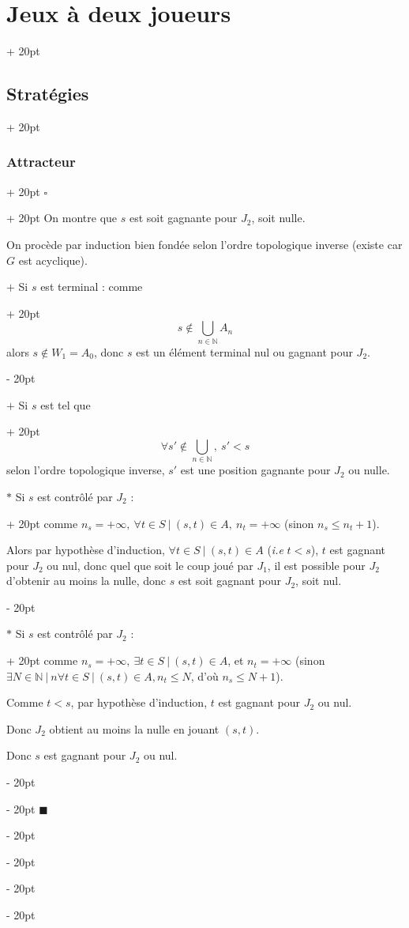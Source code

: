 \documentclass[a4paper, 12pt, twoside]{article}
\newcommand{\N}{\mathbb{N}} %
\renewcommand{\le}{\leqslant}
\newcommand{\ind}[1][20pt]{\advance\leftskip + #1}
\newcommand{\deind}[1][20pt]{\advance\leftskip - #1}
\newenvironment{indt}[2][20pt]{#2 \par \ind[#1]}{\par \deind} %
\newenvironment{proof}[1][{}]{\begin{indt}{$\square$ #1}}{$\blacksquare$ \end{indt}}
\begin{document}
\begin{indt}{\section{Jeux à deux joueurs}}
\begin{indt}{\subsection{Stratégies}}
\begin{indt}{\subsubsection{Attracteur}}
\begin{proof}
                    On montre que $s$ est soit gagnante pour $J_2$, soit nulle.

                    On procède par induction bien fondée selon l'ordre topologique inverse (existe car $G$ est acyclique).

                    \begin{indt}{$+$ Si $s$ est terminal : comme}
                        \[
                            s \notin \bigcup_{n \in \N} A_n
                        \]
                        alors $s \notin W_1 = A_0$, donc $s$ est un élément terminal nul ou gagnant pour $J_2$.
                    \end{indt}

                    \begin{indt}{$+$ Si $s$ est tel que}
                        \[
                            \forall s' \notin \bigcup_{n \in \N},\ s' < s
                        \]
                        selon l'ordre topologique inverse, $s'$ est une position gagnante pour $J_2$ ou nulle.

                        \begin{indt}{$*$ Si $s$ est contrôlé par $J_2$ :}
                            comme $n_s = +\infty,\ \forall t \in S\ |\ (s, t) \in A,\ n_t = +\infty$ (sinon $n_s \le n_t + 1$).

                            Alors par hypothèse d'induction, $\forall t \in S\ |\ (s, t) \in A$ (\textit{i.e} $t < s$), $t$ est gagnant pour $J_2$ ou nul, donc quel que soit le coup joué par $J_1$, il est possible pour $J_2$ d'obtenir au moins la nulle, donc $s$ est soit gagnant pour $J_2$, soit nul.
                        \end{indt}

                        \begin{indt}{$*$ Si $s$ est contrôlé par $J_2$ :}
                            comme $n_s = +\infty,\ \exists t \in S\ |\ (s, t) \in A$, et $n_t = +\infty$ (sinon $\exists N \in \N\ |\ n\forall t \in S\ |\ (s, t) \in A, n_t \le N$, d'où $n_s \le N + 1$).

                            Comme $t < s$, par hypothèse d'induction, $t$ est gagnant pour $J_2$ ou nul.

                            Donc $J_2$ obtient au moins la nulle en jouant $(s, t)$.

                            Donc $s$ est gagnant pour $J_2$ ou nul.
                        \end{indt}
                    \end{indt}
                \end{proof}


\end{indt}
\end{indt}
\end{indt}
\end{document}
